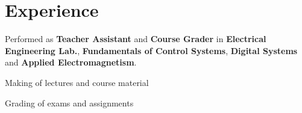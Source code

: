 \section{Experience \faGears}

Performed as \textbf{Teacher Assistant} and \textbf{Course Grader} in \textbf{Electrical Engineering Lab.}, \textbf{Fundamentals of Control Systems}, \textbf{Digital Systems} and \textbf{Applied Electromagnetism}.
\begin{tightemize}
\item Making of lectures and course material
\item Grading of exams and assignments
\end{tightemize}
\sectionsep

